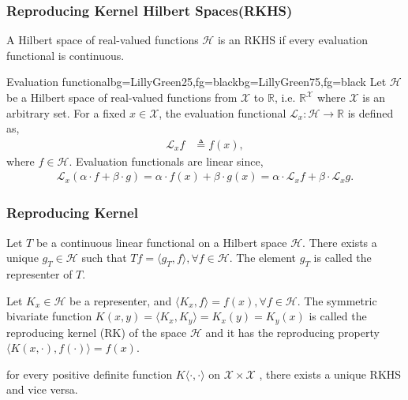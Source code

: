 \documentclass{beamer}
\def\cal{\mathcal}
\begin{document}
\begin{frame}
	\frametitle{Reproducing Kernel Hilbert Spaces(RKHS)}
	\begin{definition}[RKHS]
		A Hilbert space of real-valued functions $\cal{H}$ is an RKHS if every evaluation functional is continuous.
	\end{definition}
	\begin{variableblock}{Evaluation functional}{bg=LillyGreen25,fg=black}{bg=LillyGreen75,fg=black}
		Let $\cal{H}$ be a Hilbert space of real-valued functions from $\cal{X}$ to $\mathbb{R}$, i.e. $\mathbb{R}^{\cal{X}}$  where $\cal{X}$ is an arbitrary set. For a fixed $x \in {\cal X}$, the evaluation functional ${\cal L}_x:\cal{H} \rightarrow \mathbb{R}$ is defined as,
		\begin{align*}
			{\cal L}_x f &\triangleq f(x),
		\end{align*}
		where $f \in \cal{H}$. Evaluation functionals are linear since,
		\begin{eqnarray*}
			{\cal L}_x (\alpha \cdot f + \beta \cdot g) = \alpha \cdot f(x) + \beta \cdot g(x) = \alpha \cdot {\cal L}_x f + \beta \cdot {\cal L}_x g.
		\end{eqnarray*}
	\end{variableblock}
\end{frame}

\begin{frame}
	\frametitle{Reproducing Kernel}
	\begin{theorem}
		Let $T$ be a continuous linear functional on a Hilbert space ${\cal H}$. There exists a unique $g_{T} \in {\cal H}$ such that $T f = \langle g_{T}, f\rangle, \forall  f \in {\cal H}$. The element $g_{T}$ is called the representer of $T$.
	\end{theorem}
	\begin{definition}
		Let $K_x \in {\cal H}$ be a representer, and $\langle K_x, f\rangle = f(x), \forall f \in {\cal H}$. The symmetric bivariate function $K(x,y)=\langle K_x, K_y\rangle=K_x(y)=K_y(x)$ is called the reproducing kernel (RK) of the space ${\cal H}$ and it has the reproducing property $\langle K(x,\cdot), f(\cdot)\rangle = f(x)$.
	\end{definition}
	
	\begin{theorem}
		for every positive definite function $K\langle\cdot, \cdot\rangle$ on ${\cal X} \times {\cal X}$ , there exists a unique RKHS and vice versa.
	\end{theorem}
\end{frame}
\end{document}
